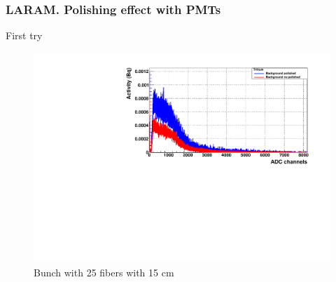 \documentclass{beamer}
\begin{document}
\begin{frame}
\frametitle{LARAM. Polishing effect with PMTs}
First try

\begin{figure}[hbtp]
\centering
\includegraphics[scale=0.5]{LARAM/Polishing_effect/First_try/Background_polish_not_polish.pdf}
\caption{Bunch with 25 fibers with 15 cm}
\end{figure}

\end{frame}
\end{document}
